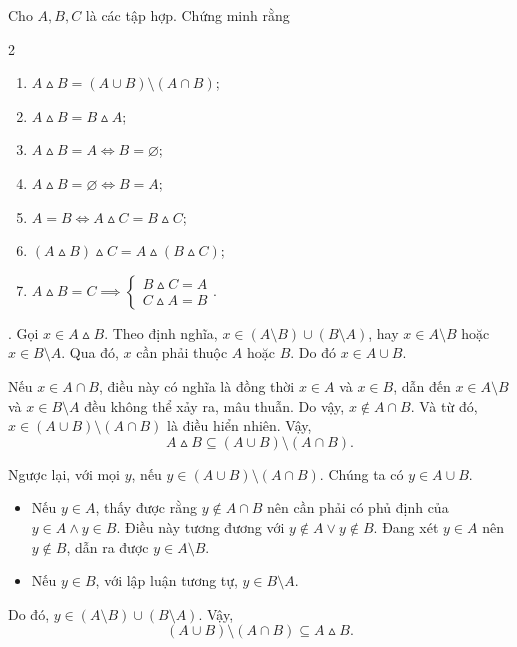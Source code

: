 \exercise Cho $A, B, C$ là các tập hợp. Chứng minh rằng
\begin{multicols}{2}
   \begin{enumerate}
      \item $A \vartriangle B = (A \cup B) \setminus (A \cap B)$;
      \item $A \vartriangle B = B \vartriangle A$;
      \item $A \vartriangle B = A \iff B = \varnothing$;
      \item $A \vartriangle B = \varnothing \iff B = A$;
      \item $A = B \iff A \vartriangle C = B \vartriangle C$;
      \item $(A \vartriangle B) \vartriangle C = A \vartriangle (B \vartriangle C)$;
      \item $A \vartriangle B = C \implies \begin{cases}
         B \vartriangle C = A \\
         C \vartriangle A = B
      \end{cases}$.
   \end{enumerate}
\end{multicols}

\solution

\setcounter{subexercise}{1}
. Gọi $x \in A \vartriangle B$. Theo định nghĩa, $x \in (A \setminus B) \cup (B \setminus A)$, hay $x \in A \setminus B$ hoặc $x \in B \setminus A$. Qua đó, $x$ cần phải thuộc $A$ hoặc $B$. Do đó $x \in A\cup B$.

Nếu $x \in A\cap B$, điều này có nghĩa là đồng thời $x \in A$ và $x \in B$, dẫn đến $x \in A \setminus B$ và $x \in B \setminus A$ đều không thể xảy ra, mâu thuẫn. Do vậy, $x \notin A \cap B$. Và từ đó, $x \in (A \cup B) \setminus (A \cap B)$ là điều hiển nhiên. Vậy,
\begin{equation*}
   A \vartriangle B \subseteq (A \cup B) \setminus (A \cap B).
\end{equation*}

Ngược lại, với mọi $y$, nếu $y \in (A \cup B) \setminus (A \cap B)$. Chúng ta có $y \in A \cup B$.
\begin{itemize}
   \item Nếu $y \in A$, thấy được rằng $y \notin A \cap B$ nên cần phải có phủ định của $y \in A \land y \in B$. Điều này tương đương với $y \notin A \lor y \notin B$. Đang xét $y \in A$ nên $y \notin B$, dẫn ra được $y \in A \setminus B$.
   \item Nếu $y \in B$, với lập luận tương tự, $y \in B \setminus A$.
\end{itemize}
Do đó, $y \in (A \setminus B) \cup (B \setminus A)$. Vậy,
\begin{equation*}
   (A \cup B) \setminus (A \cap B) \subseteq A \vartriangle B.
\end{equation*}

